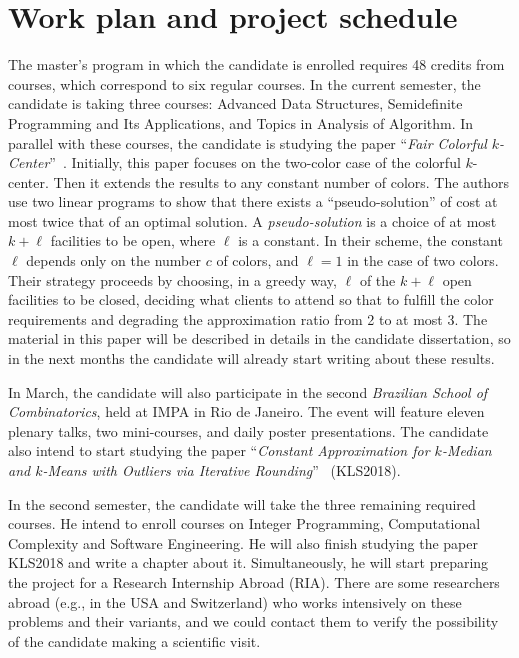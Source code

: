 \documentclass[12pt]{article}
\begin{document}
\section{Work plan and project schedule}
The master's program in which the candidate is enrolled requires 48 credits from courses, which correspond to six regular courses. 
In the current semester, the candidate is taking three courses: Advanced Data Structures, Semidefinite Programming and Its Applications, and Topics in Analysis of Algorithm. 
In parallel with these courses, the candidate is studying the paper ``\emph{Fair Colorful $k$-Center}''~\cite{JSS2020}. 
Initially, this paper focuses on the two-color case of the colorful $k$-center. 
Then it extends the results to any constant number of colors. 
The authors use two linear programs to show that there exists a ``pseudo-solution'' of cost at most twice that of an optimal solution. 
A \emph{pseudo-solution} is a choice of at most $k + \ell$ facilities to be open, where $\ell$ is a constant. In their scheme, the constant $\ell$ depends only on the number $c$ of colors, and $\ell = 1$ in the case of two colors.
Their strategy proceeds by choosing, in a greedy way, $\ell$ of the $k+\ell$ open facilities to be closed, deciding what clients to attend so that to fulfill the color requirements and degrading the approximation ratio from 2 to at most 3.
The material in this paper will be described in details in the candidate dissertation, so in the next months the candidate will already start writing about these results.

In March, the candidate will also participate in the second \emph{Brazilian School of Combinatorics}, held at IMPA in Rio de Janeiro. 
The event will feature eleven plenary talks, two mini-courses, and daily poster presentations. 
The candidate also intend to start studying the paper ``\emph{Constant Approximation for $k$-Median and $k$-Means with Outliers
via Iterative Rounding}''~\cite{KLS2018} (KLS2018).

In the second semester, the candidate will take the three remaining required courses.
He intend to enroll courses on Integer Programming, Computational Complexity and Software Engineering. 
He will also finish studying the paper KLS2018 and write a chapter about it.
Simultaneously, he will start preparing the project for a Research Internship Abroad (RIA). 
There are some researchers abroad (e.g., in the USA and Switzerland) who works intensively on these problems and their variants, and we could contact them to verify the possibility of the candidate making a scientific visit.
\end{document}

